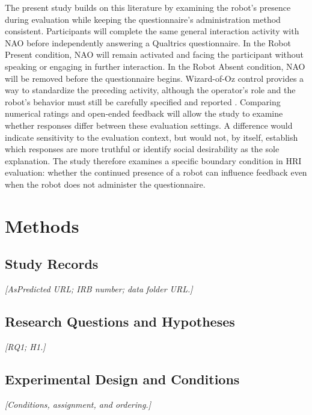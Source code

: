 \documentclass[sigconf,nonacm]{acmart}
\newcommand{\placeholder}[1]{\textit{[#1]}}
\newif\ifdraftspacing
\newcommand{\draftspace}[1]{\ifdraftspacing\par\vspace*{#1}\fi}
\begin{document}
The present study builds on this literature by examining the robot's presence during evaluation while keeping the questionnaire's administration method consistent. Participants will complete the same general interaction activity with NAO before independently answering a Qualtrics questionnaire. In the Robot Present condition, NAO will remain activated and facing the participant without speaking or engaging in further interaction. In the Robot Absent condition, NAO will be removed before the questionnaire begins. Wizard-of-Oz control provides a way to standardize the preceding activity, although the operator's role and the robot's behavior must still be carefully specified and reported \cite{riek2012}. Comparing numerical ratings and open-ended feedback will allow the study to examine whether responses differ between these evaluation settings. A difference would indicate sensitivity to the evaluation context, but would not, by itself, establish which responses are more truthful or identify social desirability as the sole explanation. The study therefore examines a specific boundary condition in HRI evaluation: whether the continued presence of a robot can influence feedback even when the robot does not administer the questionnaire.
\draftspace{12mm}

\section{Methods}
\label{sec:methods}

\subsection{Study Records}
\placeholder{AsPredicted URL; IRB number; data folder URL.}
\draftspace{20mm}

\subsection{Research Questions and Hypotheses}
\placeholder{RQ1; H1.}
\draftspace{25mm}

\subsection{Experimental Design and Conditions}
\placeholder{Conditions, assignment, and ordering.}
\draftspace{25mm}
\end{document}
